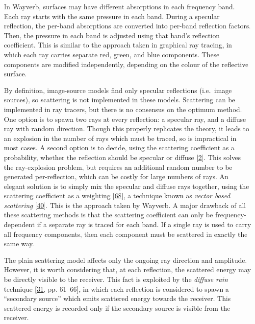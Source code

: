 \documentclass[]{scrreprt}
\begin{document}
In Wayverb, surfaces may have different absorptions in each frequency
band. Each ray starts with the same pressure in each band. During a
specular reflection, the per-band absorptions are converted into
per-band reflection factors. Then, the pressure in each band is adjusted
using that band's reflection coefficient. This is similar to the
approach taken in graphical ray tracing, in which each ray carries
separate red, green, and blue components. These components are modified
independently, depending on the colour of the reflective surface.

By definition, image-source models find only specular reflections
(i.e.~image sources), so scattering is not implemented in these models.
Scattering can be implemented in ray tracers, but there is no consensus
on the optimum method. One option is to spawn two rays at every
reflection: a specular ray, and a diffuse ray with random direction.
Though this properly replicates the theory, it leads to an explosion in
the number of rays which must be traced, so is impractical in most
cases. A second option is to decide, using the scattering coefficient as
a probability, whether the reflection should be specular or diffuse
{[}\protect\hyperlink{ref-saviojaux5foverviewux5f2015}{2}{]}. This
solves the ray-explosion problem, but requires an additional random
number to be generated per-reflection, which can be costly for large
numbers of rays. An elegant solution is to simply mix the specular and
diffuse rays together, using the scattering coefficient as a weighting
{[}\protect\hyperlink{ref-rindelux5fuseux5f2000}{68}{]}, a technique
known as \emph{vector based scattering}
{[}\protect\hyperlink{ref-christensenux5fnewux5f2005}{40}{]}. This is
the approach taken by Wayverb. A major drawback of all these scattering
methods is that the scattering coefficient can only be
frequency-dependent if a separate ray is traced for each band. If a
single ray is used to carry all frequency components, then each
component must be scattered in exactly the same way.

The plain scattering model affects only the ongoing ray direction and
amplitude. However, it is worth considering that, at each reflection,
the scattered energy may be directly visible to the receiver. This fact
is exploited by the \emph{diffuse rain} technique
{[}\protect\hyperlink{ref-schroderux5fphysicallyux5f2011}{31}, pp.
61--66{]}, in which each reflection is considered to spawn a ``secondary
source'' which emits scattered energy towards the receiver. This
scattered energy is recorded only if the secondary source is visible
from the receiver.
\end{document}
